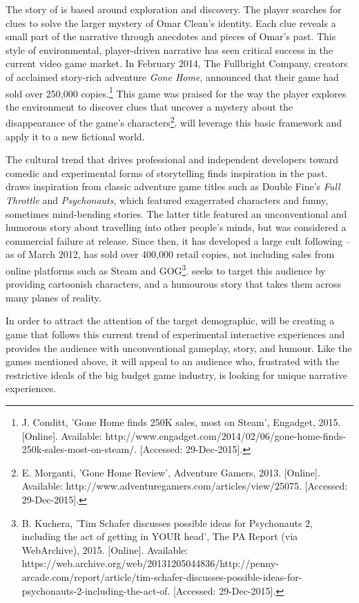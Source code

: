 The story of \ourgame{} is based around exploration and discovery. The player searches for clues to solve the larger mystery of Omar Clean's identity. Each clue reveals a small part of the narrative through anecdotes and pieces of Omar's past. This style of environmental, player-driven narrative has seen critical success in the current video game market. In February 2014, The Fullbright Company, creators of acclaimed story-rich adventure \textit{Gone Home}, announced that their game had sold over 250,000 copies.\footnote{J. Conditt, 'Gone Home finds 250K sales, most on Steam', Engadget, 2015. [Online]. Available: http://www.engadget.com/2014/02/06/gone-home-finds-250k-sales-most-on-steam/. [Accessed: 29-Dec-2015].} This game was praised for the way the player explores the environment to discover clues that uncover a mystery about the disappearance of the game's characters\footnote{E. Morganti, 'Gone Home Review', Adventure Gamers, 2013. [Online]. Available: http://www.adventuregamers.com/articles/view/25075. [Accessed: 29-Dec-2015].}. \ourgame{} will leverage this basic framework and apply it to a new fictional world.

The cultural trend that drives professional and independent developers toward comedic and experimental forms of storytelling finds inspiration in the past. \ourgame{} draws inspiration from classic adventure game titles such as Double Fine's \textit{Full Throttle} and  \textit{Psychonauts}, which featured exagerrated characters and funny, sometimes mind-bending stories. The latter title featured an unconventional and humorous story about travelling into other people's minds, but was considered a commercial failure at release. Since then, it has developed a large cult following -- as of March 2012, has sold over 400,000 retail copies, not including sales from online platforms such as Steam and GOG\footnote{B. Kuchera, 'Tim Schafer discusses possible ideas for Psychonauts 2, including the act of getting in YOUR head', The PA Report (via WebArchive), 2015. [Online]. Available: https://web.archive.org/web/20131205044836/http://penny-arcade.com/report/article/tim-schafer-discusses-possible-ideas-for-psychonauts-2-including-the-act-of. [Accessed: 29-Dec-2015].}. \ourgame{} seeks to target this audience by providing cartoonish characters, and a humourous story that takes them across many planes of reality.

In order to attract the attention of the target demographic, \ourteam{} will be creating a game that follows this current trend of experimental interactive experiences and provides the audience with unconventional gameplay, story, and humour. Like the games mentioned above, it will appeal to an audience who, frustrated with the restrictive ideals of the big budget game industry, is looking for unique narrative experiences.